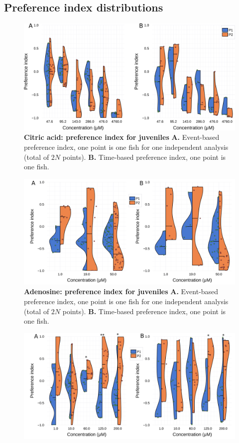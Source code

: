 \begin{appendices}
  \chapter{Preference index distributions}
    \begin{figure}[h]
      \centering
      \includegraphics[width=1\textwidth]{part_2/assets/dist_acid.png}
      \caption{\textbf{Citric acid: preference index for juveniles} \textbf{A.} Event-based preference index, one point is one fish for one independent analysis (total of $2N$ points). \textbf{B.} Time-based preference index, one point is one fish. }
      \label{dist_citric_acid}
    \end{figure}
    \begin{figure}[h]
      \centering
      \includegraphics[width=1\textwidth]{part_2/assets/dist_adenosine.png}
      \caption{\textbf{Adenosine: preference index for juveniles} \textbf{A.} Event-based preference index, one point is one fish for one independent analysis (total of $2N$ points). \textbf{B.} Time-based preference index, one point is one fish. }
      \label{dist_adenosine}
    \end{figure}
    \begin{figure}[h]
      \centering
      \includegraphics[width=1\textwidth]{part_2/assets/dist_atp.png}

\end{figure}
\end{appendices}
